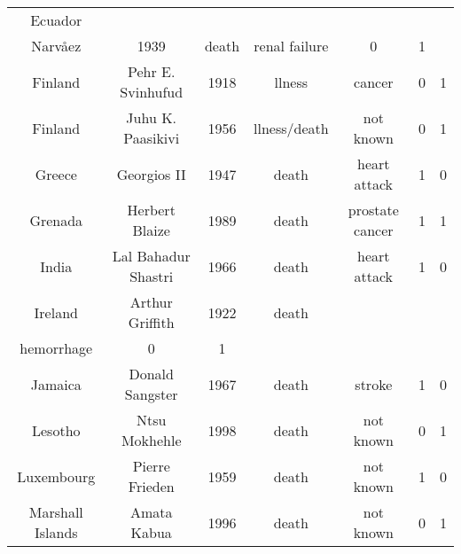 \begin{center}
\begin{longtable}{ccccccc}
Ecuador          & \begin{tabular}[c]{@{}c@{}}Aurelio Mosquera\\ Narvåez\end{tabular} & 1939 & death        & renal failure                                                            & 0 & 1 \\
Finland          & Pehr E. Svinhufud                                                  & 1918 & llness       & cancer                                                                   & 0 & 1 \\
Finland          & Juhu K. Paasikivi                                                  & 1956 & llness/death & not known                                                                & 0 & 1 \\
Greece           & Georgios II                                                        & 1947 & death        & heart attack                                                             & 1 & 0 \\
Grenada          & Herbert Blaize                                                     & 1989 & death        & prostate cancer                                                          & 1 & 1 \\
India            & Lal Bahadur Shastri                                                & 1966 & death        & heart attack                                                             & 1 & 0 \\
Ireland          & Arthur Griffith                                                    & 1922 & death        & \begin{tabular}[c]{@{}c@{}}brain\\ hemorrhage\end{tabular}               & 0 & 1 \\
Jamaica          & Donald Sangster                                                    & 1967 & death        & stroke                                                                   & 1 & 0 \\
Lesotho          & Ntsu Mokhehle                                                      & 1998 & death        & not known                                                                & 0 & 1 \\
Luxembourg       & Pierre Frieden                                                     & 1959 & death        & not known                                                                & 1 & 0 \\
Marshall Islands & Amata Kabua                                                        & 1996 & death        & not known                                                                & 0 & 1 \\

\end{longtable}
\end{center}
